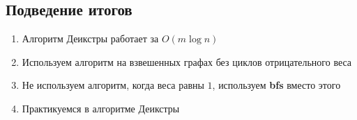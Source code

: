 \documentclass[../../main.tex]{subfiles}
\begin{document}


\subsection{Подведение итогов}

\begin{enumerate}[label=\Roman*]
    \item Алгоритм Деикстры работает за $O(m \log {n})$
    \item Используем алгоритм на взвешенных графах без циклов отрицательного веса
    \item Не используем алгоритм, когда веса равны $1$, используем \textbf{bfs} вместо этого
    \item Практикуемся в алгоритме Деикстры
\end{enumerate}
\end{document}
